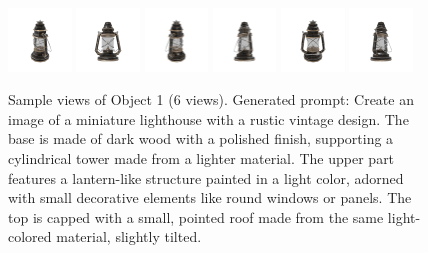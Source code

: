 \begin{figure}[htbp]
  \centering
  \includegraphics[width=0.15\textwidth]{images/data/samples/obj1/000.jpeg}\hfill
  \includegraphics[width=0.15\textwidth]{images/data/samples/obj1/001.jpeg}\hfill
  \includegraphics[width=0.15\textwidth]{images/data/samples/obj1/002.jpeg}\hfill
  \includegraphics[width=0.15\textwidth]{images/data/samples/obj1/003.jpeg}\hfill
  \includegraphics[width=0.15\textwidth]{images/data/samples/obj1/004.jpeg}\hfill
  \includegraphics[width=0.15\textwidth]{images/data/samples/obj1/005.jpeg}

  \caption{Sample views of Object 1 (6 views). Generated prompt: Create an image of a miniature lighthouse with a rustic vintage design. The base is made of dark wood with a polished finish, supporting a cylindrical tower made from a lighter material. The upper part features a lantern-like structure painted in a light color, adorned with small decorative elements like round windows or panels. The top is capped with a small, pointed roof made from the same light-colored material, slightly tilted.}
  \label{fig:dataset-sample-obj1}
\end{figure}

